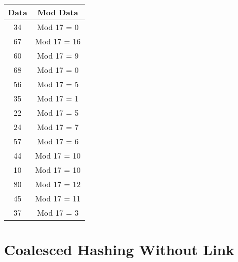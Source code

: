 \documentclass[12pt,a4paper]{article}
\begin{document}
\begin{enumerate}
\begin{multicols}{2}
      \begin{center}
        \begin{adjustbox}{scale=1,center}
          \begin{tabular}{ |c|c| } 
            \hline 
            Data & Mod Data \\ \hline \hline 
            34  & Mod 17 = 0 \\ \hline
            67  & Mod 17 = 16 \\ \hline
            60  & Mod 17 = 9 \\ \hline
            68  & Mod 17 = 0 \\ \hline
            56  & Mod 17 = 5 \\ \hline
            35  & Mod 17 = 1 \\ \hline
            22  & Mod 17 = 5 \\ \hline
            24  & Mod 17 = 7 \\ \hline
            57  & Mod 17 = 6 \\ \hline
            44  & Mod 17 = 10 \\ \hline
            10  & Mod 17 = 10 \\ \hline
            80  & Mod 17 = 12 \\ \hline
            45  & Mod 17 = 11 \\ \hline
            37  & Mod 17 = 3 \\ \hline
          \end{tabular}
        \end{adjustbox}
      \end{center}

    \end{multicols}

    \section*{Coalesced Hashing Without Link}

\end{enumerate}
\end{document}
